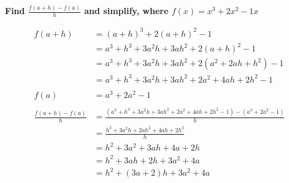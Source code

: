 \documentclass[crop=false,fleqn]{standalone}
\begin{document}
    \textbf{Find $\frac{f(a+h)-f(a)}{h}$ and simplify, where $f(x)=x^3+2x^2-1 x$}

    \begin{align*}
        f(a+h) &= (a+h)^3+2(a+h)^2-1 \\
            &= a^3+h^3+3a^2h+3ah^2+2(a+h)^2 -1 \tag{$\because(a+b)^3=a^3+b^3+3a^2b+3ab^2$} \\
            &= a^3+h^3+3a^2h+3ah^2+2(a^2+2ah+h^2) -1 \\
            &= a^3+h^3+3a^2h+3ah^2+2a^2+4ah+2h^2 -1 \\
        \\
        f(a) &= a^3+2a^2-1\\
        \\
        \frac{f(a+h)-f(a)}{h} &= \frac{(a^3+h^3+3a^2h+3ah^2+2a^2+4ah+2h^2-1) - (a^3+2a^2-1)}{h} \\
            &= \frac{h^3+3a^2h+2ah^2+4ah+2h^2}{h} \\
            &= h^2+3a^2+3ah+4a+2h \\
            &= h^2+3ah+2h+3a^2+4a \tag{By Rearranging} \\
            &= h^2+(3a+2)h+3a^2+4a
    \end{align*}
\end{document}
